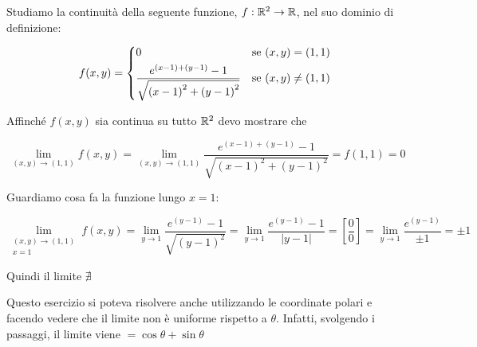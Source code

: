 Studiamo la continuità della seguente funzione, \(f: \mathbb{R}^2 \to \mathbb{R} \), nel suo dominio di definizione:

\[
    f(x,y) = \begin{cases*}
        0                                                                      & se \((x,y) = (1,1)\)   \\
        \displaystyle{\frac{e^{(x-1)+(y-1)} -1}{\sqrt{{(x-1)}^2 + {(y-1)}^2}}} & se \((x,y) \ne (1,1)\)
    \end{cases*}
\]

Affinché \(f(x,y)\) sia continua su tutto \(\mathbb{R}^2\) devo mostrare che

\[
    \lim_{(x,y) \to (1,1)} f(x,y) = \lim_{(x,y) \to (1,1)} \frac{e^{(x-1)+(y-1)} -1}{\sqrt{{(x-1)}^2 + {(y-1)}^2}} = f(1,1) = 0
\]

Guardiamo cosa fa la funzione lungo \(x=1\):

\[
    \lim_{\begin{smallmatrix}(x,y) \to (1,1) \\ x=1\end{smallmatrix}} f(x,y) =
    \lim_{y \to 1} \frac{e^{(y-1)} -1}{\sqrt{{(y-1)}^2}} =
    \lim_{y \to 1} \frac{e^{(y-1)} -1}{|y-1|} =
    \left[\frac{0}{0}\right] =
    \lim_{y \to 1} \frac{e^{(y-1)}}{\pm 1} = \pm 1
\]

Quindi il limite \(\nexists \)

Questo esercizio si poteva risolvere anche utilizzando le coordinate polari e facendo vedere che il limite non è uniforme rispetto a \(\theta \). Infatti, svolgendo i passaggi, il limite viene \(= \cos\theta + \sin\theta \)

